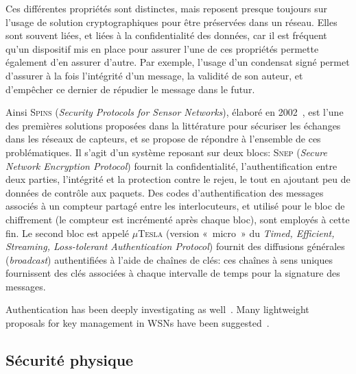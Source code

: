 Ces différentes propriétés sont distinctes, mais reposent presque toujours sur l'usage de solution cryptographiques pour être préservées dans un réseau.
Elles sont souvent liées, et liées à la confidentialité des données, car il est fréquent qu'un dispositif mis en place pour assurer l'une de ces propriétés permette également d'en assurer d'autre.
Par exemple, l'usage d'un condensat signé permet d'assurer à la fois l'intégrité d'un message, la validité de son auteur, et d'empêcher ce dernier de répudier le message dans le futur.

Ainsi \textsc{Spins} (\textit{Security Protocols for Sensor Networks}), élaboré en 2002~\cite{PSWCT02}, est l'une des premières solutions proposées dans la littérature pour sécuriser les échanges dans les réseaux de capteurs, et se propose de répondre à l'ensemble de ces problématiques.
Il s'agit d'un système reposant sur deux blocs: \textsc{Snep} (\textit{Secure Network Encryption Protocol}) fournit la confidentialité, l'authentification entre deux parties, l'intégrité et la protection contre le rejeu, le tout en ajoutant peu de données de contrôle aux paquets.
Des codes d'authentification des messages associés à un compteur partagé entre les interlocuteurs, et utilisé pour le bloc de chiffrement (le compteur est incrémenté après chaque bloc), sont employés à cette fin.
Le second bloc est appelé $\mu$\textsc{Tesla} (version « micro » du \textit{Timed, Efficient, Streaming, Loss-tolerant Authentication Protocol}) fournit des diffusions générales (\textit{broadcast}) authentifiées à l'aide de chaînes de clés: ces chaînes à sens uniques fournissent des clés associées à chaque intervalle de temps pour la signature des messages.




Authentication has been deeply investigating as well~\cite{GWZC13}.
Many lightweight proposals for key management in WSNs have been suggested~\cite{GWZCK13,BSK13}. %







\subsection{Sécurité physique}

